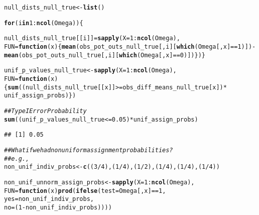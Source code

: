\documentclass[11pt,leqno]{article}\usepackage[]{graphicx}\usepackage[]{color}
\makeatletter
\newcommand{\hlnum}[1]{\textcolor[rgb]{0.686,0.059,0.569}{#1}}%
\newcommand{\hlcom}[1]{\textcolor[rgb]{0.678,0.584,0.686}{\textit{#1}}}%
\newcommand{\hlopt}[1]{\textcolor[rgb]{0,0,0}{#1}}%
\newcommand{\hlstd}[1]{\textcolor[rgb]{0.345,0.345,0.345}{#1}}%
\newcommand{\hlkwa}[1]{\textcolor[rgb]{0.161,0.373,0.58}{\textbf{#1}}}%
\newcommand{\hlkwb}[1]{\textcolor[rgb]{0.69,0.353,0.396}{#1}}%
\newcommand{\hlkwc}[1]{\textcolor[rgb]{0.333,0.667,0.333}{#1}}%
\newcommand{\hlkwd}[1]{\textcolor[rgb]{0.737,0.353,0.396}{\textbf{#1}}}%
\newenvironment{kframe}{%
 \def\at@end@of@kframe{}%
 \ifinner\ifhmode%
  \def\at@end@of@kframe{\end{minipage}}%
  \begin{minipage}{\columnwidth}%
 \fi\fi%
 \def\FrameCommand##1{\hskip\@totalleftmargin \hskip-\fboxsep
 \colorbox{shadecolor}{##1}\hskip-\fboxsep
     \hskip-\linewidth \hskip-\@totalleftmargin \hskip\columnwidth}%
 \MakeFramed {\advance\hsize-\width
   \@totalleftmargin\z@ \linewidth\hsize
   \@setminipage}}%
 {\par\unskip\endMakeFramed%
 \at@end@of@kframe}
\newenvironment{knitrout}{}{} %
\theoremstyle{newstyle}
\makeatother
\begin{document}
\begin{knitrout}
\begin{kframe}
\begin{alltt}
\hlstd{null_dists_null_true} \hlkwb{<-} \hlkwd{list}\hlstd{()}

\hlkwa{for}\hlstd{(i} \hlkwa{in} \hlnum{1}\hlopt{:}\hlkwd{ncol}\hlstd{(Omega))\{}

  \hlstd{null_dists_null_true[[i]]} \hlkwb{=} \hlkwd{sapply}\hlstd{(}\hlkwc{X} \hlstd{=} \hlnum{1}\hlopt{:}\hlkwd{ncol}\hlstd{(Omega),}
                           \hlkwc{FUN} \hlstd{=} \hlkwa{function}\hlstd{(}\hlkwc{x}\hlstd{) \{} \hlkwd{mean}\hlstd{(obs_pot_outs_null_true[,i][}\hlkwd{which}\hlstd{(Omega[,x]} \hlopt{==} \hlnum{1}\hlstd{)])} \hlopt{-}
                               \hlkwd{mean}\hlstd{(obs_pot_outs_null_true[,i][}\hlkwd{which}\hlstd{(Omega[,x]} \hlopt{==} \hlnum{0}\hlstd{)]) \}) \}}

\hlstd{unif_p_values_null_true} \hlkwb{<-} \hlkwd{sapply}\hlstd{(}\hlkwc{X} \hlstd{=} \hlnum{1}\hlopt{:}\hlkwd{ncol}\hlstd{(Omega),}
                                  \hlkwc{FUN} \hlstd{=} \hlkwa{function}\hlstd{(}\hlkwc{x}\hlstd{) \{} \hlkwd{sum}\hlstd{((null_dists_null_true[[x]]} \hlopt{>=} \hlstd{obs_diff_means_null_true[x])} \hlopt{*}
                                                            \hlstd{unif_assign_probs) \})}

\hlcom{## Type I Error Probability}
\hlkwd{sum}\hlstd{((unif_p_values_null_true} \hlopt{<=} \hlnum{0.05}\hlstd{)} \hlopt{*} \hlstd{unif_assign_probs)}
\end{alltt}
\begin{verbatim}
## [1] 0.05
\end{verbatim}
\begin{alltt}
\hlcom{## What if we had nonuniform assignment probabilities?}
\hlcom{## e.g.,}
\hlstd{non_unif_indiv_probs} \hlkwb{<-} \hlkwd{c}\hlstd{((}\hlnum{3}\hlopt{/}\hlnum{4}\hlstd{), (}\hlnum{1}\hlopt{/}\hlnum{4}\hlstd{), (}\hlnum{1}\hlopt{/}\hlnum{2}\hlstd{), (}\hlnum{1}\hlopt{/}\hlnum{4}\hlstd{), (}\hlnum{1}\hlopt{/}\hlnum{4}\hlstd{), (}\hlnum{1}\hlopt{/}\hlnum{4}\hlstd{))}

\hlstd{non_unif_unnorm_assign_probs} \hlkwb{<-} \hlkwd{sapply}\hlstd{(}\hlkwc{X} \hlstd{=} \hlnum{1}\hlopt{:}\hlkwd{ncol}\hlstd{(Omega),}
                                       \hlkwc{FUN} \hlstd{=} \hlkwa{function}\hlstd{(}\hlkwc{x}\hlstd{)} \hlkwd{prod}\hlstd{(}\hlkwd{ifelse}\hlstd{(}\hlkwc{test} \hlstd{= Omega[,x]} \hlopt{==} \hlnum{1}\hlstd{,}
                                                                     \hlkwc{yes} \hlstd{= non_unif_indiv_probs,}
                                                                     \hlkwc{no} \hlstd{=  (}\hlnum{1} \hlopt{-} \hlstd{non_unif_indiv_probs))))}


\end{alltt}
\end{kframe}
\end{knitrout}
\end{document}
